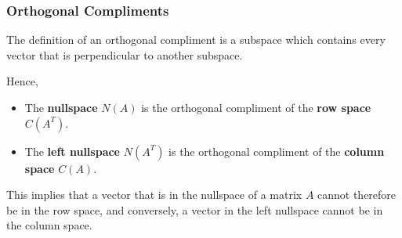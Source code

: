         \subsubsection{Orthogonal Compliments}
            The definition of an orthogonal compliment is a subspace which contains every vector that is perpendicular
            to another subspace.

            Hence,
            \begin{itemize}
                \item The \textbf{nullspace} \(N(A)\) is the orthogonal compliment of the \textbf{row space} 
                \(C(A^T)\).
                \item The \textbf{left nullspace} \(N(A^T)\) is the orthogonal compliment of the \textbf{column space} 
                \(C(A)\).
            \end{itemize}
            This implies that a vector that is in the nullspace of a matrix \(A\) cannot therefore be in the row space,
            and conversely, a vector in the left nullspace cannot be in the column space.

